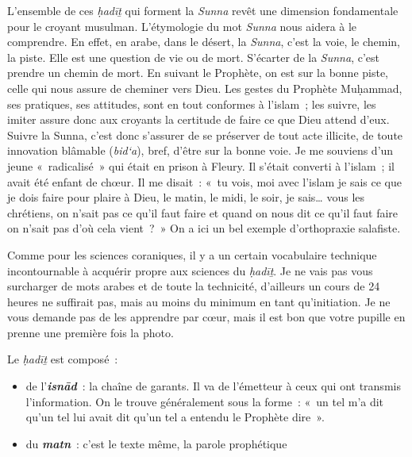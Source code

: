 L'ensemble de ces \emph{ḥadīṯ} qui forment la \emph{Sunna} revêt une
dimension fondamentale pour le croyant musulman. L'étymologie du mot
\emph{Sunna} nous aidera à le comprendre. En effet, en arabe, dans le
désert, la \emph{Sunna}, c'est la voie, le chemin, la piste. Elle est
une question de vie ou de mort. S'écarter de la \emph{Sunna}, c'est
prendre un chemin de mort. En suivant le Prophète, on est sur la bonne
piste, celle qui nous assure de cheminer vers Dieu. Les gestes du
Prophète Muḥammad, ses pratiques, ses attitudes, sont en tout conformes
à l'islam~; les suivre, les imiter assure donc aux croyants la certitude
de faire ce que Dieu attend d'eux. Suivre la Sunna, c'est donc s'assurer
de se préserver de tout acte illicite, de toute innovation blâmable
(\emph{bid`a}), bref, d'être sur la bonne voie. Je me souviens d'un
jeune «~radicalisé~» qui était en prison à Fleury. Il s'était converti à
l'islam~; il avait été enfant de chœur. Il me disait~: «~tu vois, moi
avec l'islam je sais ce que je dois faire pour plaire à Dieu, le matin,
le midi, le soir, je sais\ldots{} vous les chrétiens, on n'sait pas ce
qu'il faut faire et quand on nous dit ce qu'il faut faire on n'sait pas
d'où cela vient~?~» On a ici un bel exemple d'orthopraxie salafiste.

Comme pour les sciences coraniques, il y a un certain vocabulaire
technique incontournable à acquérir propre aux sciences du \emph{ḥadīṯ}.
Je ne vais pas vous surcharger de mots arabes et de toute la technicité,
d'ailleurs un cours de 24 heures ne suffirait pas, mais au moins du
minimum en tant qu'initiation. Je ne vous demande pas de les apprendre
par cœur, mais il est bon que votre pupille en prenne une première fois
la photo.


\begin{Def}
Le \emph{ḥadīṯ} est composé~:

\begin{itemize}
\item
  de l'\emph{\textbf{isnād}}~: la chaîne de garants. Il va de l'émetteur
  à ceux qui ont transmis l'information. On le trouve généralement sous
  la forme~: «~un tel m'a dit qu'un tel lui avait dit qu'un tel a
  entendu le Prophète dire~».
\item
  du \emph{\textbf{matn}}~: c'est le texte même, la parole prophétique
\end{itemize}
\end{Def}


